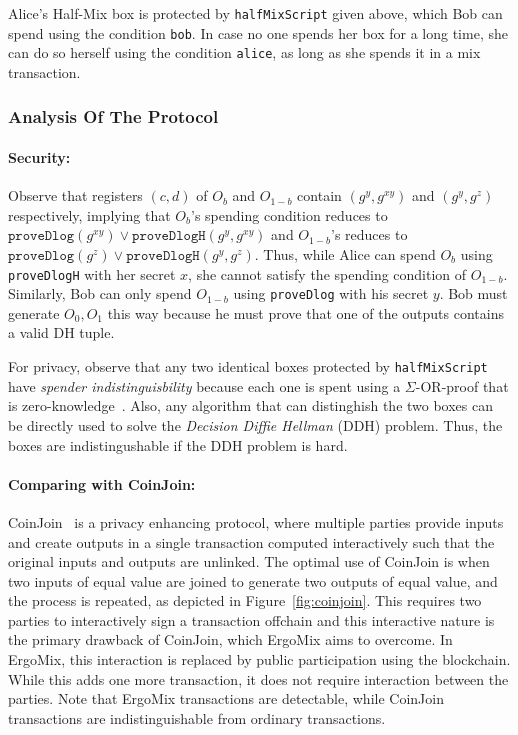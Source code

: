 \documentclass[11pt]{article}
\newcommand{\mixname}{ErgoMix\xspace}
\begin{document}
Alice's Half-Mix box is protected by \texttt{halfMixScript} given above, which Bob can spend using the condition \texttt{bob}. In case no one spends her box for a long time, she can do so herself using the condition \texttt{alice}, as long as she spends it in a mix transaction.  

\subsubsection{Analysis Of The Protocol}
\paragraph{Security:} Observe that registers $(c, d)$ of $O_b$ and $O_{1-b}$ contain $(g^y, g^{xy})$ and $(g^y, g^z)$ respectively, implying that $O_b$'s  spending condition reduces to $\texttt{proveDlog}(g^{xy}) \lor \texttt{proveDlogH}(g^y, g^{xy})$ and $O_{1-b}$'s reduces to $\texttt{proveDlog}(g^z) \lor \texttt{proveDlogH}(g^{y}, g^z)$. Thus, while Alice can spend $O_b$ using \texttt{proveDlogH} with her secret $x$, she cannot satisfy the spending condition of $O_{1-b}$. Similarly, Bob can only spend $O_{1-b}$ using \texttt{proveDlog} with his secret $y$. Bob must generate $O_0, O_1$ this way because he must prove that one of the outputs contains a valid DH tuple.

For privacy, observe that any two identical boxes protected by \texttt{halfMixScript} have {\em spender indistinguisbility} because each one is spent using a $\Sigma$-OR-proof that is zero-knowledge~\cite{Dam10}. Also, any algorithm that can distinghish the two boxes can be directly used to solve the {\em Decision Diffie Hellman} (DDH) problem. Thus, the boxes are indistingushable if the DDH problem is hard.

\paragraph{Comparing with CoinJoin:} CoinJoin~\cite{coinjoin} is a privacy enhancing protocol, where multiple parties provide inputs and create outputs in a single transaction computed interactively such that the original inputs and outputs are unlinked. The optimal use of CoinJoin is when two inputs of equal value are joined to generate two outputs of equal value, and the process is repeated, as depicted in Figure~\ref{fig:coinjoin}. 
This requires two parties to interactively sign a transaction offchain and this interactive nature is the primary drawback of CoinJoin, which \mixname aims to overcome. 
In \mixname, this interaction is replaced by public participation using the blockchain. While this adds one more transaction, it does not require interaction between the parties. Note that \mixname transactions are detectable, while CoinJoin transactions are indistinguishable from ordinary transactions. 
\end{document}

